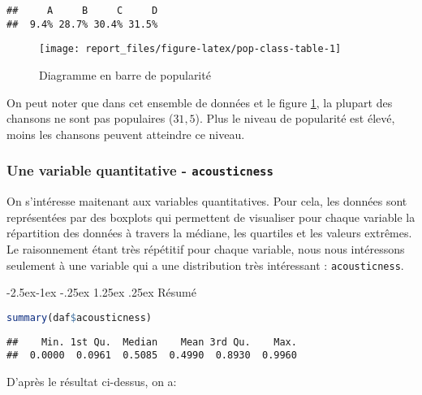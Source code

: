 \documentclass[
  11pt,
  xcolor = usenames,dvipsnames]{article}
\makeatletter
\newcommand{\passthrough}[1]{#1}
\renewcommand\paragraph{\@startsection{paragraph}{4}{\z@}%
        {-2.5ex\@plus -1ex \@minus -.25ex}%
        {1.25ex \@plus .25ex}%
        {\normalfont\normalsize\bfseries}}
\makeatother
\begin{document}
\begin{lstlisting}
##     A     B     C     D 
##  9.4% 28.7% 30.4% 31.5%
\end{lstlisting}

\begin{figure}

{\centering \texttt{[image: report\_files/figure-latex/pop-class-table-1]} 

}

\caption{Diagramme en barre de popularité}\label{fig:pop-class-table}
\end{figure}

On peut noter que dans cet ensemble de données et le figure \ref{fig:pop-class-table}, la plupart des chansons ne sont pas populaires (\(31,5%
\)).
Plus le niveau de popularité est élevé, moins les chansons peuvent atteindre ce niveau.

\hypertarget{une-variable-quantitative---acousticness}{%
\subsubsection{\texorpdfstring{Une variable quantitative - \texttt{acousticness}}{Une variable quantitative - acousticness}}\label{une-variable-quantitative---acousticness}}

On s'intéresse maitenant aux variables quantitatives.
Pour cela, les données sont représentées par des boxplots qui permettent de visualiser pour chaque variable la répartition des données à travers la médiane,
les quartiles et les valeurs extrêmes. Le raisonnement étant très répétitif pour chaque variable,
nous nous intéressons seulement à une variable qui a une distribution très intéressant : \passthrough{\lstinline!acousticness!}.

\hypertarget{ruxe9sumuxe9}{%
\paragraph{Résumé}\label{ruxe9sumuxe9}}

\begin{lstlisting}[language=R]
summary(daf$acousticness)
\end{lstlisting}

\begin{lstlisting}
##    Min. 1st Qu.  Median    Mean 3rd Qu.    Max. 
##  0.0000  0.0961  0.5085  0.4990  0.8930  0.9960
\end{lstlisting}

D'après le résultat ci-dessus, on a:
\end{document}
